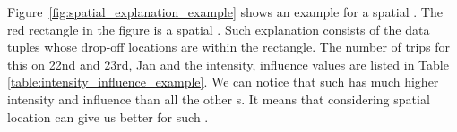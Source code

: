 Figure~\ref{fig:spatial_explanation_example} shows an example for a spatial {\explanation}. The red rectangle in the figure is a spatial {\explanation}. Such explanation consists of the data tuples whose drop-off locations are within the rectangle. The number of trips for this {\explanation} on 22nd and 23rd, Jan and the intensity, influence values are listed in Table \ref{table:intensity_influence_example}. We can notice that such {\explanation} has much higher intensity and influence than all the other {\explanation}s. It means that considering spatial location can give us better {\explanation} for such {\fact}. 







